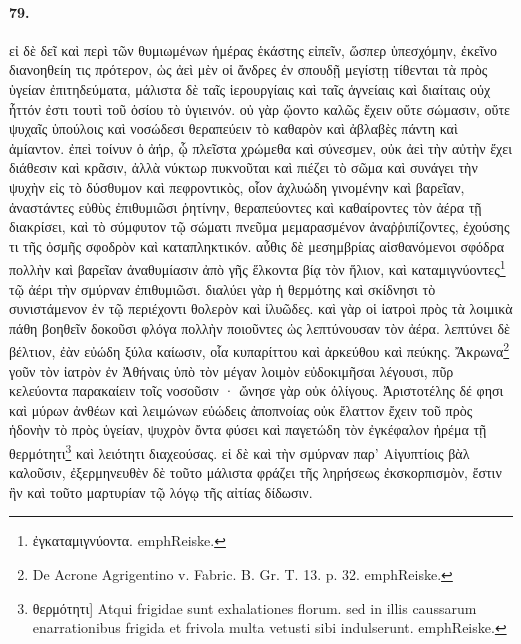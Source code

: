 \documentclass[a4paper, 11pt, oneside, polutonikogreek, german]{article}
\begin{document}
\paragraph{79.}
εἰ δὲ δεῖ καὶ περὶ τῶν θυμιωμένων ἡμέρας ἑκάστης εἰπεῖν, ὥσπερ ὑπεσχόμην, ἐκεῖνο διανοηθείη τις πρότερον, ὡς ἀεὶ μὲν οἱ ἄνδρες ἐν σπουδῇ μεγίστῃ τίθενται τὰ πρὸς ὑγείαν ἐπιτηδεύματα, μάλιστα δὲ ταῖς ἱερουργίαις καὶ ταῖς ἁγνείαις καὶ διαίταις οὐχ ἧττόν ἐστι τουτὶ τοῦ ὁσίου τὸ ὑγιεινόν. οὐ γὰρ ᾤοντο καλῶς ἔχειν οὔτε σώμασιν, οὔτε ψυχαῖς ὑπούλοις καὶ νοσώδεσι θεραπεύειν τὸ καθαρὸν καὶ ἀβλαβὲς πάντη καὶ ἀμίαντον. ἐπεὶ τοίνυν ὁ ἀήρ, ᾧ πλεῖστα χρώμεθα καὶ σύνεσμεν, οὐκ ἀεὶ τὴν αὐτὴν ἔχει διάθεσιν καὶ κρᾶσιν, ἀλλὰ νύκτωρ πυκνοῦται καὶ πιέζει τὸ σῶμα καὶ συνάγει τὴν ψυχὴν εἰς τὸ δύσθυμον καὶ πεφροντικὸς, οἷον ἀχλυώδη γινομένην καὶ βαρεῖαν, ἀναστάντες εὐθὺς ἐπιθυμιῶσι ῥητίνην, θεραπεύοντες καὶ καθαίροντες τὸν ἀέρα τῇ διακρίσει, καὶ τὸ σύμφυτον τῷ σώματι πνεῦμα μεμαρασμένον ἀναῤῥιπίζοντες, ἐχούσης τι τῆς ὀσμῆς σφοδρὸν καὶ καταπληκτικόν. αὖθις δὲ μεσημβρίας αἰσθανόμενοι σφόδρα πολλὴν καὶ βαρεῖαν ἀναθυμίασιν ἀπὸ γῆς ἕλκοντα βίᾳ τὸν ἥλιον, καὶ καταμιγνύοντες\footnote{ἐγκαταμιγνύοντα. emph{Reiske.}} τῷ ἀέρι τὴν σμύρναν ἐπιθυμιῶσι. διαλύει γὰρ ἡ θερμότης καὶ σκίδνησι τὸ συνιστάμενον ἐν τῷ περιέχοντι θολερὸν καὶ ἰλυῶδες. καὶ γὰρ οἱ ἰατροὶ πρὸς τὰ λοιμικὰ πάθη βοηθεῖν δοκοῦσι φλόγα πολλὴν ποιοῦντες ὡς λεπτύνουσαν τὸν ἀέρα. λεπτύνει δὲ βέλτιον, ἐὰν εὐώδη ξύλα καίωσιν, οἷα κυπαρίττου καὶ ἀρκεύθου καὶ πεύκης. Ἄκρωνα\footnote{De Acrone Agrigentino v. Fabric. B. Gr. T. 13. p. 32. emph{Reiske.}} γοῦν τὸν ἰατρὸν ἐν Ἀθήναις ὑπὸ τὸν μέγαν λοιμὸν εὐδοκιμῆσαι λέγουσι, πῦρ κελεύοντα παρακαίειν τοῖς νοσοῦσιν · ὤνησε γὰρ οὐκ ὀλίγους. Ἀριστοτέλης δέ φησι καὶ μύρων ἀνθέων καὶ λειμώνων εὐώδεις ἀποπνοίας οὐκ ἔλαττον ἔχειν τοῦ πρὸς ἡδονὴν τὸ πρὸς ὑγείαν, ψυχρὸν ὄντα φύσει καὶ παγετώδη τὸν ἐγκέφαλον ἠρέμα τῇ θερμότητι\footnote{θερμότητι] Atqui frigidae sunt exhalationes florum. sed in illis caussarum enarrationibus frigida et frivola multa vetusti sibi indulserunt. emph{Reiske.}} καὶ λειότητι διαχεούσας. εἰ δὲ καὶ τὴν σμύρναν παρ' Αἰγυπτίοις βὰλ καλοῦσιν, ἐξερμηνευθὲν δὲ τοῦτο μάλιστα φράζει τῆς ληρήσεως ἐκσκορπισμὸν, ἔστιν ἣν καὶ τοῦτο μαρτυρίαν τῷ λόγῳ τῆς αἰτίας δίδωσιν.
\end{document}
